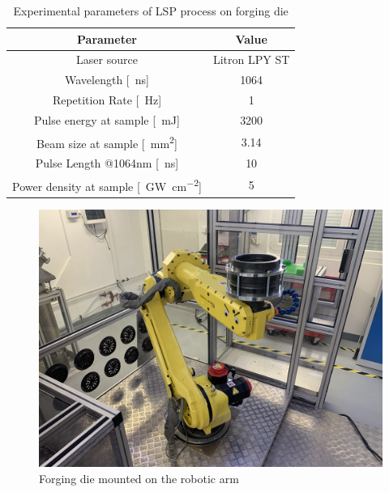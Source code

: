 \begin{table}[h!]
\centering
    \begin{threeparttable}
        \begin{tabular}{|c | c|} 
        \hline
            \textbf{Parameter} & \textbf{Value} \\ [0.5ex] 
        \hline
        Laser source & Litron LPY ST  \\
        \hline
        Wavelength [\SI{}{\nano\second}] & 1064 \\
        \hline
        Repetition Rate [\SI{}{\hertz}] & 1  \\ 
        \hline
            Pulse energy at sample [\SI{}{\milli\joule}] & 3200 \\
        \hline
            Beam size at sample [\SI{}{\mm\squared}] & 3.14 \\
        \hline
            Pulse Length @1064nm [\SI{}{\nano\second}] & 10 \\
        \hline
            Power density at sample [\SI{}{\giga\watt\per\cm\squared}] & 5 \\

        \hline
        \end{tabular}

        \caption{Experimental parameters of LSP process on forging die}
        \label{experimental_forging}
    \end{threeparttable}
\end{table}

\begin{figure}[h]
    \centering
    \includegraphics[width=0.9\linewidth]{img/cast.jpeg}
    \caption{Forging die mounted on the robotic arm}
    \label{fig:cast}
\end{figure}

